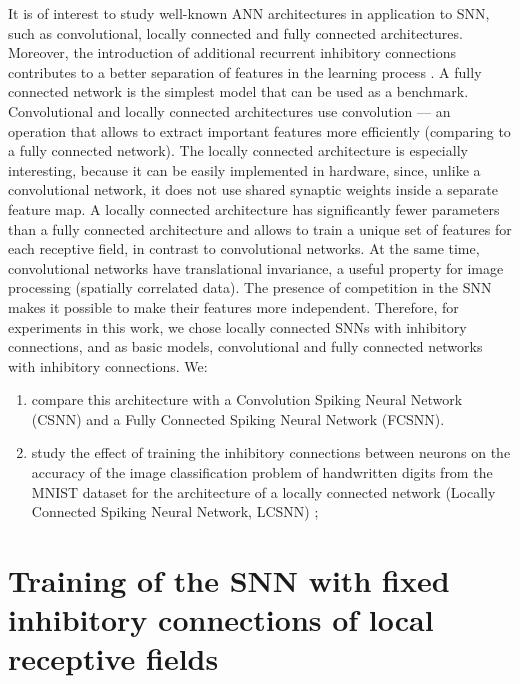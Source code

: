\documentclass[a4paper,10pt]{article}
\begin{document}
It is of interest to study well-known ANN architectures in application to SNN, such as convolutional, locally connected and fully connected \cite{Khan_2020} architectures. Moreover, the introduction of additional recurrent inhibitory connections contributes to a better separation of features in the learning process \cite{MaxActiv1, MaxActiv2}. A fully connected network is the simplest model that can be used as a benchmark. Convolutional and locally connected architectures use convolution --- an operation that allows to extract important features more efficiently (comparing to a fully connected network). The locally connected architecture is especially interesting, because it can be easily implemented in hardware, since, unlike a convolutional network, it does not use shared synaptic weights  inside a separate feature map. A locally connected architecture has significantly fewer parameters than a fully connected architecture and allows to train a unique set of features for each receptive field, in contrast to convolutional networks. At the same time, convolutional networks have translational invariance, a useful property for image processing (spatially correlated data). The presence of competition in the SNN makes it possible to make their features more independent. Therefore, for experiments in this work, we chose locally connected SNNs with inhibitory connections, and as basic models, convolutional and fully connected networks with inhibitory connections. We:

\begin{enumerate}[i]

\item compare this architecture with a Convolution Spiking Neural Network (CSNN) and a Fully Connected Spiking Neural Network (FCSNN).

\item study the effect of training the inhibitory connections \cite{MaxActiv1, MaxActiv2, hardware_survey} between neurons on the accuracy of the image classification problem of handwritten digits from the MNIST \cite{MNIST} dataset for the architecture of a locally connected network (Locally Connected Spiking Neural Network, LCSNN) \cite{saunders2019locally};

\end{enumerate}

\clearpage

\section{Training of the SNN with fixed inhibitory connections of local receptive fields}
\end{document}
